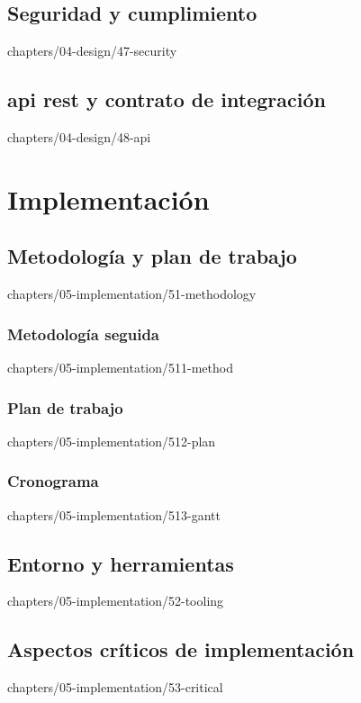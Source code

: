 \documentclass[epsbased,tfg,covers,final,printable,extendedindex,%
               firstnumbered,lof,lot, loc]{tfgtfmthesisuam}
\begin{document}
  \section{Seguridad y cumplimiento\label{SEC:DES-SECURITY}}%
          {chapters/04-design/47-security}
  \section[\acs{api} \acs{rest} y contrato de integración]%
          {\acs{api} \acs{rest} y contrato de integración%
           \label{SEC:DES-API}}%
          {chapters/04-design/48-api}


\chapter{Implementación\label{CAP:IMPLEMENTATION}}
  \section{Metodología y plan de trabajo\label{SEC:IMPL-METHODOLOGY}}%
          {chapters/05-implementation/51-methodology}
    \subsection{Metodología seguida\label{SS:IMPL-METHOD}}%
                {chapters/05-implementation/511-method}
    \subsection{Plan de trabajo\label{SS:IMPL-PLAN}}%
                {chapters/05-implementation/512-plan}
    \subsection{Cronograma\label{SS:IMPL-GANTT}}%
                {chapters/05-implementation/513-gantt}
  \section{Entorno y herramientas\label{SEC:IMPL-TOOLING}}%
          {chapters/05-implementation/52-tooling}
  \section[Aspectos críticos de implementación]%
          {Aspectos críticos de
           implementación\label{SEC:IMPL-CRITICAL}}%
          {chapters/05-implementation/53-critical}
\end{document}

